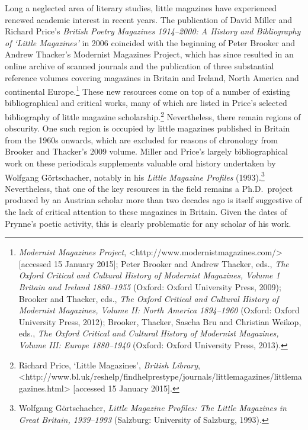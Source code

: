 \documentclass[]{article}
\begin{document}
Long a neglected area of literary studies, little magazines have
experienced renewed academic interest in recent years. The publication
of David Miller and Richard Price's \emph{British Poetry Magazines
1914--2000: A History and Bibliography of `Little Magazines'} in 2006
coincided with the beginning of Peter Brooker and Andrew Thacker's
Modernist Magazines Project, which has since resulted in an online
archive of scanned journals and the publication of three substantial
reference volumes covering magazines in Britain and Ireland, North
America and continental Europe.\footnote{\emph{Modernist Magazines
  Project}, \textless{}http://www.modernistmagazines.com/\textgreater{}
  {[}accessed 15 January 2015{]}; Peter Brooker and Andrew Thacker,
  eds., \emph{The Oxford Critical and Cultural History of Modernist
  Magazines, Volume 1 Britain and Ireland 1880--1955} (Oxford: Oxford
  University Press, 2009); Brooker and Thacker, eds., \emph{The Oxford
  Critical and Cultural History of Modernist Magazines, Volume II: North
  America 1894--1960} (Oxford: Oxford University Press, 2012); Brooker,
  Thacker, Sascha Bru and Christian Weikop, eds., \emph{The Oxford
  Critical and Cultural History of Modernist Magazines, Volume III:
  Europe 1880--1940} (Oxford: Oxford University Press, 2013).} These new
resources come on top of a number of existing bibliographical and
critical works, many of which are listed in Price's selected
bibliography of little magazine scholarship.\footnote{Richard Price,
  `Little Magazines', \emph{British Library},
  \textless{}http://www.bl.uk/reshelp/findhelprestype/journals/littlemagazines/littlemagazines.html\textgreater{}
  {[}accessed 15 January 2015{]}.} Nevertheless, there remain regions of
obscurity. One such region is occupied by little magazines published in
Britain from the 1960s onwards, which are excluded for reasons of
chronology from Brooker and Thacker's 2009 volume. Miller and Price's
largely bibliographical work on these periodicals supplements valuable
oral history undertaken by Wolfgang Görtschacher, notably in his
\emph{Little Magazine Profiles} (1993).\footnote{Wolfgang Görtschacher,
  \emph{Little Magazine Profiles: The Little Magazines in Great Britain,
  1939--1993} (Salzburg: University of Salzburg, 1993).} Nevertheless,
that one of the key resources in the field remains a Ph.D.~project
produced by an Austrian scholar more than two decades ago is itself
suggestive of the lack of critical attention to these magazines in
Britain. Given the dates of Prynne's poetic activity, this is clearly
problematic for any scholar of his work.
\end{document}
